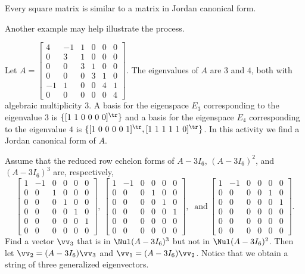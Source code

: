 \begin{theorem} \label{thm:JCF} Every square matrix is similar to a matrix in Jordan canonical form.
\end{theorem}

Another example may help illustrate the process. 

\begin{activity} Let $A = \left[ \begin{array}{rrcccc} 4&-1&1&0&0&0 \\ 0&3&1&0&0&0 \\ 0&0&3&1&0&0 \\ 0&0&0&3&1&0 \\ -1&1&0&0&4&1 \\ 0&0&0&0&0&4 \end{array} \right]$. The eigenvalues of $A$ are $3$ and $4$, both with algebraic multiplicity 3. A basis for the eigenspace $E_3$ corresponding to the eigenvalue $3$ is $\{[1 \ 1 \ 0 \ 0 \ 0 \ 0]^{\tr}\}$ and a basis for the eigenspace $E_4$ corresponding to the eigenvalue $4$ is $\{[1 \ 0 \ 0 \ 0 \ 0 \ 1]^{\tr}, [1 \ 1 \ 1 \ 1 \ 1 \ 0]^{\tr}\}$. In this activity we find a Jordan canonical form of $A$. 
\ba
\item Assume that the reduced row echelon forms of $A -3 I_6$, $(A-3I_6)^2$, and $(A-3I_6)^3$ are, respectively, 
\[ \left[ \begin{array}{crcccc} 1&-1&0&0&0&0\\ 0&0&1&0&0&0 \\ 0&0&0&1&0&0\\ 0&0&0&0&1&0 \\ 0&0&0&0&0&1 \\ 0&0&0&0&0&0\end{array} \right], \ \left[ \begin{array}{crcccc} 1&-1&0&0&0&0\\ 0&0&0&1&0&0\\ 0&0&0&0&1&0\\ 0&0&0&0&0&1 \\ 0&0&0&0&0&0 \\ 0&0&0&0&0&0 \end {array} \right],  \ \text{ and} \  \left[ \begin{array}{crcccc} 1&-1&0&0&0&0\\ 0&0&0&0&1&0\\ 0&0&0&0&0&1\\ 0&0&0&0&0&0 \\ 0&0&0&0&0&0 \\ 0&0&0&0&0&0 \end {array} \right].\]
Find a vector $\vv_3$ that is in $\Nul (A-3I_6)^3$ but not in $\Nul (A-3I_6)^2$. Then let $\vv_2 = (A-3I_6)\vv_3$ and $\vv_1 = (A-3I_6)\vv_2$. Notice that we obtain a string of three generalized eigenvectors. 


\end{activity}
